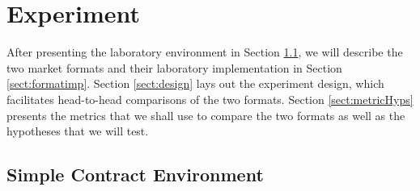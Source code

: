 



\section{Experiment}
\label{Experiment}

After presenting the laboratory environment in Section \ref{sect:contracts}, we will describe the two market formats and their laboratory implementation in Section \ref{sect:formatimp}.
Section \ref{sect:design} lays out the experiment design, which facilitates head-to-head comparisons of the two formats. 
Section \ref{sect:metricHyps} presents the metrics that we shall use to compare the two formats as well as the hypotheses that we will test.
\subsection{Simple Contract Environment}\label{sect:contracts}

